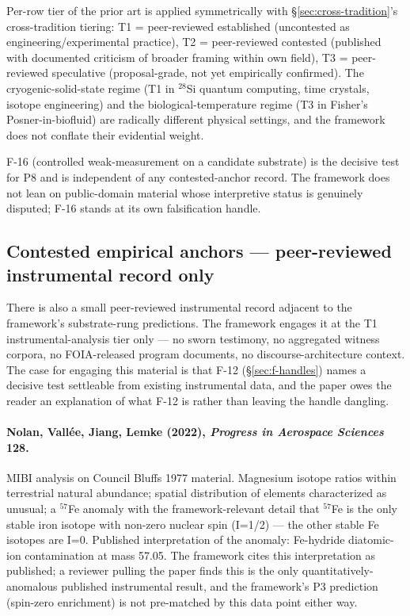 \documentclass[11pt,a4paper]{article}
\begin{document}
Per-row tier of the prior art is applied symmetrically with \S\ref{sec:cross-tradition}'s cross-tradition tiering: T1 = peer-reviewed established (uncontested as engineering/experimental practice), T2 = peer-reviewed contested (published with documented criticism of broader framing within own field), T3 = peer-reviewed speculative (proposal-grade, not yet empirically confirmed). The cryogenic-solid-state regime (T1 in $^{28}$Si quantum computing, time crystals, isotope engineering) and the biological-temperature regime (T3 in Fisher's Posner-in-biofluid) are radically different physical settings, and the framework does not conflate their evidential weight.

F-16 (controlled weak-measurement on a candidate substrate) is the decisive test for P8 and is independent of any contested-anchor record. The framework does not lean on public-domain material whose interpretive status is genuinely disputed; F-16 stands at its own falsification handle.

\subsection*{Contested empirical anchors --- peer-reviewed instrumental record only}\label{sec:contested-instrumental}

There is also a small peer-reviewed instrumental record adjacent to the framework's substrate-rung predictions. The framework engages it at the T1 instrumental-analysis tier only --- no sworn testimony, no aggregated witness corpora, no FOIA-released program documents, no discourse-architecture context. The case for engaging this material is that F-12 (\S\ref{sec:f-handles}) names a decisive test settleable from existing instrumental data, and the paper owes the reader an explanation of what F-12 is rather than leaving the handle dangling.

\paragraph{Nolan, Vall\'ee, Jiang, Lemke (2022), \emph{Progress in Aerospace Sciences} 128.} MIBI analysis on Council Bluffs 1977 material. Magnesium isotope ratios within terrestrial natural abundance; spatial distribution of elements characterized as unusual; a $^{57}$Fe anomaly with the framework-relevant detail that $^{57}$Fe is the only stable iron isotope with non-zero nuclear spin (I=1/2) --- the other stable Fe isotopes are I=0. Published interpretation of the anomaly: Fe-hydride diatomic-ion contamination at mass 57.05. The framework cites this interpretation as published; a reviewer pulling the paper finds this is the only quantitatively-anomalous published instrumental result, and the framework's P3 prediction (spin-zero enrichment) is not pre-matched by this data point either way.
\end{document}
